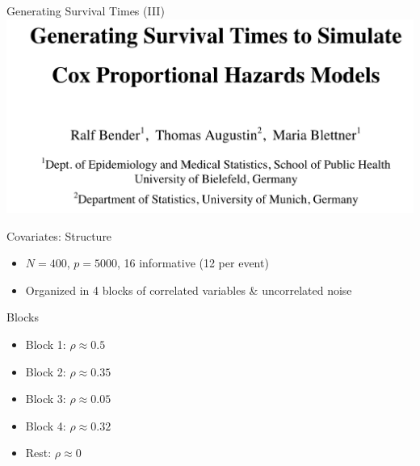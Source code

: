 \documentclass{beamer}
\providecommand{\tightlist}{%
  \setlength{\itemsep}{0pt}\setlength{\parskip}{0pt}}
\begin{document}
\begin{frame}{Generating Survival Times (III)}
\protect\hypertarget{generating-survival-times-iii}{}
\includegraphics[width=0.95\linewidth]{img/bender2003}

\textcite{bender2005generatingsurvival}
\end{frame}

\begin{frame}{Covariates: Structure}
\protect\hypertarget{covariates-structure}{}
\begin{itemize}
\tightlist
\item
  \(N = 400\), \(p = 5000\), 16 informative (12 per event)
\item
  Organized in 4 blocks of correlated variables \& uncorrelated noise
\end{itemize}

\begin{block}{Blocks}
\protect\hypertarget{blocks}{}
\begin{itemize}
\tightlist
\item
  Block 1: \(\rho \approx 0.5\)
\item
  Block 2: \(\rho \approx 0.35\)
\item
  Block 3: \(\rho \approx 0.05\)
\item
  Block 4: \(\rho \approx 0.32\)
\item
  Rest: \(\rho \approx 0\)
\end{itemize}
\end{block}
\end{frame}
\end{document}
